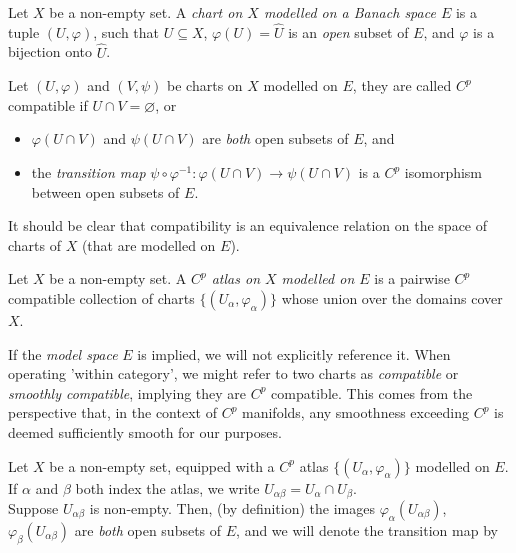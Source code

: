 \documentclass[../main-manifolds.tex]{subfiles}
\begin{document}
\begin{definition}[Chart]\label{def:chart}
    Let $X$ be a non-empty set. A \emph{chart on $X$ modelled on a Banach space $E$} is a tuple $(U,\varphi)$, such that $U\subseteq X$,  $\varphi(U)=\hat{U}$ is an \emph{open} subset of $E$, and $\varphi$ is a bijection onto $\hat{U}$.
\end{definition}
\begin{definition}[Compatibility]\label{def:compatibility}
    Let $(U,\varphi)$ and $(V,\psi)$ be charts on $X$ modelled on $E$, they are called $C^p$ compatible if $U\cap V=\varnothing$, or 
    \begin{itemize}
        \item $\varphi(U\cap V)$ and $\psi(U\cap V)$ are \emph{both} open subsets of $E$, and
        \item the \emph{transition map} $\psi\circ\varphi^{-1}: \varphi(U\cap V)\to \psi(U\cap V)$ is a $C^p$ isomorphism between open subsets of $E$.
    \end{itemize}
    It should be clear that compatibility is an equivalence relation on the space of charts of $X$ (that are modelled on $E$).
\end{definition}
\begin{definition}[Atlas]\label{def:atlas}
    Let $X$ be a non-empty set. A \emph{$C^p$ atlas on $X$ modelled on $E$} is a pairwise $C^p$ compatible collection of charts $\{(U_\alpha,\varphi_\alpha)\}$ whose union over the domains cover $X$.
\end{definition}
\begin{remark}[Omissions]
    If the \emph{model space} \( E \) is implied, we will not explicitly reference it. When operating 'within category', we might refer to two charts as \emph{compatible} or \emph{smoothly compatible}, implying they are $C^p$ compatible. This comes from the perspective that, in the context of $C^p$ manifolds, any smoothness exceeding $C^p$ is deemed sufficiently smooth for our purposes.
\end{remark}

Let $X$ be a non-empty set, equipped with a $C^p$ atlas $\{(U_\alpha,\varphi_\alpha)\}$ modelled on $E$. If $\alpha$ and $\beta$ both index the atlas, we write  $U_{\alpha\beta} = U_{\alpha}\cap U_{\beta}$.\\

Suppose $U_{\alpha\beta}$ is non-empty. Then, (by definition) the images $\varphi_{\alpha}(U_{\alpha\beta})$, $\varphi_{\beta}(U_{\alpha\beta})$ are \emph{both} open subsets of $E$, and we will denote the transition map by
\end{document}
